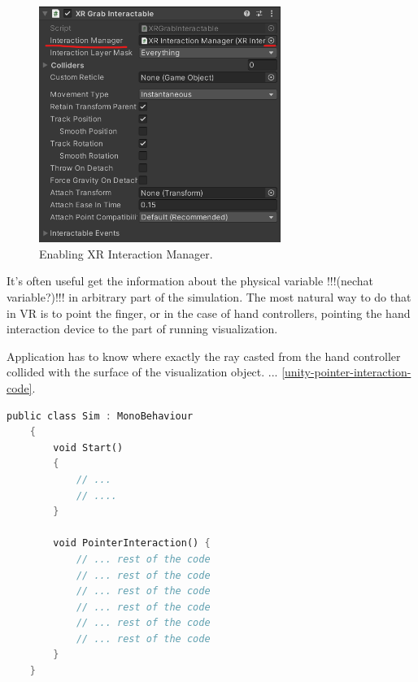 \begin{figure}[!ht]
	\centering
	\includegraphics[width=0.7\textwidth]{figures/xr-grab-interactable-script.png}
	\caption{Enabling XR Interaction Manager.}
	\label{fig:enable-xr-interaction-manager}
\end{figure}


%


It's often useful get the information about the physical variable !!!(nechat variable?)!!! in arbitrary part of the simulation. The most natural way to do that in VR is to point the finger, or in the case of hand controllers, pointing the hand interaction device to the part of running visualization. 

Application has to know where exactly the ray casted from the hand controller collided with the surface of the visualization object.  ... \ref{unity-pointer-interaction-code}.

\begin{lstlisting}[language=Rust, caption="Grab interaction code.", label=unity-pointer-interaction-code]
	public class Sim : MonoBehaviour
	{
		void Start()
		{
			// ...
			// ....
		}
		
		void PointerInteraction() {
			// ... rest of the code
			// ... rest of the code
			// ... rest of the code
			// ... rest of the code
			// ... rest of the code
			// ... rest of the code
		}
	}
\end{lstlisting}

